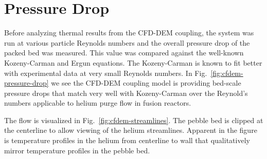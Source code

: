 \section{Pressure Drop}
Before analyzing thermal results from the CFD-DEM coupling, the system was run at various particle Reynolds numbers and the overall pressure drop of the packed bed was measured. This value was compared against the well-known Kozeny-Carman and Ergun equations. The Kozeny-Carman is known to fit better with experimental data at very small Reynolds numbers. In Fig.~\ref{fig:cfdem-pressure-drop} we see the CFD-DEM coupling model is providing bed-scale pressure drops that match very well with Kozeny-Carman over the Reynold’s numbers applicable to helium purge flow in fusion reactors.

The flow is visualized in Fig.~\ref{fig:cfdem-streamlines}. The pebble bed is clipped at the centerline to allow viewing of the helium streamlines. Apparent in the figure is temperature profiles in the helium from centerline to wall that qualitatively mirror temperature profiles in the pebble bed.

